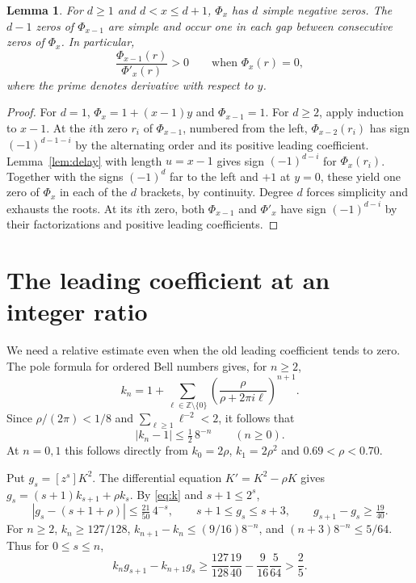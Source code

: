 \documentclass[11pt]{article}
\newtheorem{lemma}[theorem]{Lemma}
\begin{document}
\begin{lemma}\label{lem:rods}
For \(d\ge1\) and \(d<x\le d+1\), \(\Phi_x\) has \(d\) simple negative zeros. The \(d-1\) zeros of \(\Phi_{x-1}\) are simple and occur one in each gap between consecutive zeros of \(\Phi_x\). In particular,
\[
 \frac{\Phi_{x-1}(r)}{\Phi'_x(r)}>0
 \qquad\text{when }\Phi_x(r)=0,
\]
where the prime denotes derivative with respect to \(y\).
\end{lemma}
\begin{proof}
For \(d=1\), \(\Phi_x=1+(x-1)y\) and \(\Phi_{x-1}=1\). For \(d\ge2\), apply induction to \(x-1\). At the \(i\)th zero \(r_i\) of \(\Phi_{x-1}\), numbered from the left, \(\Phi_{x-2}(r_i)\) has sign \((-1)^{d-1-i}\) by the alternating order and its positive leading coefficient. Lemma~\ref{lem:delay} with length \(u=x-1\) gives sign \((-1)^{d-i}\) for \(\Phi_x(r_i)\). Together with the signs \((-1)^d\) far to the left and \(+1\) at \(y=0\), these yield one zero of \(\Phi_x\) in each of the \(d\) brackets, by continuity. Degree \(d\) forces simplicity and exhausts the roots. At its \(i\)th zero, both \(\Phi_{x-1}\) and \(\Phi'_x\) have sign \((-1)^{d-i}\) by their factorizations and positive leading coefficients.
\end{proof}

\section{The leading coefficient at an integer ratio}

We need a relative estimate even when the old leading coefficient tends to zero. The pole formula for ordered Bell numbers \cite[Theorem~14, Eq.~(6)]{aup} gives, for \(n\ge2\),
\[
 k_n=1+\sum_{\ell\in\mathbb Z\setminus\{0\}}
      \left(\frac{\rho}{\rho+2\pi i\ell}\right)^{n+1}.
\]
Since \(\rho/(2\pi)<1/8\) and \(\sum_{\ell\ge1}\ell^{-2}<2\), it follows that
\begin{equation}\label{eq:k}
 |k_n-1|\le \tfrac12\,8^{-n}\qquad(n\ge0).
\end{equation}
At \(n=0,1\) this follows directly from \(k_0=2\rho\), \(k_1=2\rho^2\) and \(0.69<\rho<0.70\).

Put \(g_s=[z^s]K^2\). The differential equation \(K'=K^2-\rho K\) gives \(g_s=(s+1)k_{s+1}+\rho k_s\). By \eqref{eq:k} and \(s+1\le2^s\),
\[
 |g_s-(s+1+\rho)|\le \tfrac{21}{50}\,4^{-s},\qquad
 s+1\le g_s\le s+3,\qquad g_{s+1}-g_s\ge \tfrac{19}{40}.
\]
For \(n\ge2\), \(k_n\ge127/128\), \(k_{n+1}-k_n\le(9/16)8^{-n}\), and \((n+3)8^{-n}\le5/64\). Thus for \(0\le s\le n\),
\begin{equation}\label{eq:barrier}
 k_ng_{s+1}-k_{n+1}g_s
 \ge \frac{127}{128}\frac{19}{40}-\frac9{16}\frac5{64}>\frac25 .
\end{equation}
\end{document}
